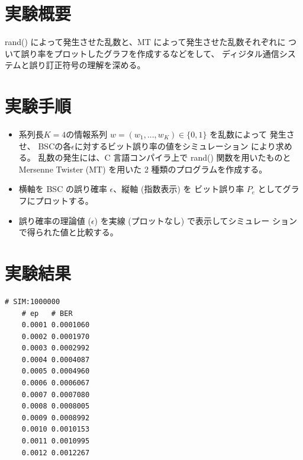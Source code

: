 \documentclass[12pt]{jarticle}
\begin{document}



\section{実験概要}
rand() によって発生させた乱数と、MT によって発生させた乱数それぞれに
ついて誤り率をプロットしたグラフを作成するなどをして、
ディジタル通信システムと誤り訂正符号の理解を深める。

\section{実験手順}
\begin{itemize}
    \item 系列長$K=4$の情報系列
          $w=(w_1,...,w_K) \in \{0,1\}$ を乱数によって
          発生させ、
          BSCの各$\epsilon$に対するビット誤り率の値をシミュレーション
          により求める。
          乱数の発生には、C 言語コンパイラ上で rand() 関数を用いたものと
          Mersenne Twister (MT) を用いた 2 種類のプログラムを作成する。
    \item 横軸を BSC の誤り確率 $\epsilon$、縦軸 (指数表示) を
          ビット誤り率 $P_e$ としてグラフにプロットする。
    \item 誤り確率の理論値 ($\epsilon$) を実線 (プロットなし) で表示してシミュレー
          ションで得られた値と比較する。
\end{itemize}

\section{実験結果}
\begin{lstlisting}[style=log,caption=rand()関数の結果(ep0.0001)]
    # SIM:1000000
    # ep   # BER
    0.0001 0.0001060
    0.0002 0.0001970
    0.0003 0.0002992
    0.0004 0.0004087
    0.0005 0.0004960
    0.0006 0.0006067
    0.0007 0.0007080
    0.0008 0.0008005
    0.0009 0.0008992
    0.0010 0.0010153
    0.0011 0.0010995
    0.0012 0.0012267
\end{lstlisting}
\end{document}

